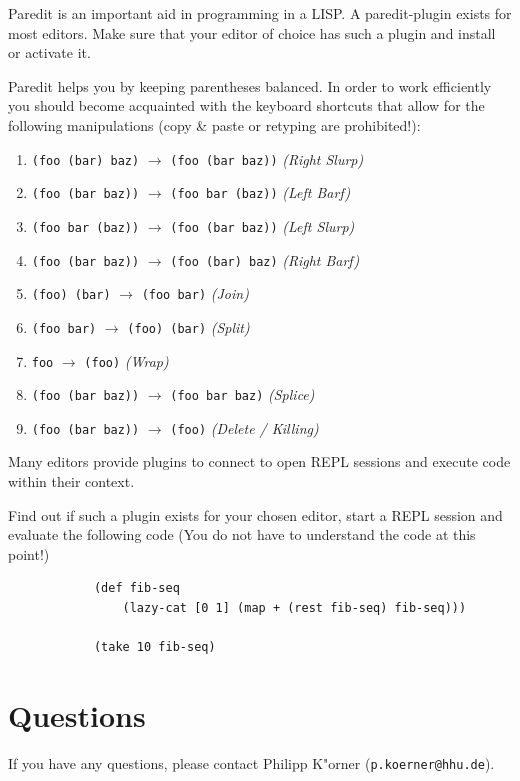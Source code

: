 \documentclass[11pt,a4paper]{article}
\begin{document}
	
	\begin{exercise}[Paredit]
		Paredit is an important aid in programming in a LISP.
		A paredit-plugin exists for most editors.
		Make sure that your editor of choice has such a plugin
		and install or activate it.
		
		
		Paredit helps you by keeping parentheses balanced.
		In order to work efficiently you should
		become acquainted with the keyboard shortcuts that allow for the following manipulations
		(copy \& paste or retyping are prohibited!):
		
		\begin{enumerate}[label=\alph*)]
			\item
			\texttt{(foo (bar) baz)} $\longrightarrow$ \texttt{(foo (bar baz))} \textit{(Right Slurp)}
			\item
			\texttt{(foo (bar baz))} $\longrightarrow$ \texttt{(foo bar (baz))} \textit{(Left Barf)}
			\item
			\texttt{(foo bar (baz))} $\longrightarrow$ \texttt{(foo (bar baz))} \textit{(Left Slurp)}
			\item
			\texttt{(foo (bar baz))} $\longrightarrow$ \texttt{(foo (bar) baz)} \textit{(Right Barf)}
			\item
			\texttt{(foo) (bar)} $\longrightarrow$ \texttt{(foo bar)} \textit{(Join)}
			\item
			\texttt{(foo bar)} $\longrightarrow$ \texttt{(foo) (bar)} \textit{(Split)}
			\item
			\texttt{foo} $\longrightarrow$ \texttt{(foo)} \textit{(Wrap)}
			\item
			\texttt{(foo (bar baz))} $\longrightarrow$ \texttt{(foo bar baz)} \textit{(Splice)}
			\item
			\texttt{(foo (bar baz))} $\longrightarrow$ \texttt{(foo)} \textit{(Delete / Killing)}
		\end{enumerate}
		
	\end{exercise}
	
	\begin{exercise}
		Many editors provide plugins
		to connect to open REPL sessions
		and execute code within their context.
		
		Find out if such a plugin exists for your chosen editor,
		start a REPL session and evaluate the following
		code (You do not have to understand the code at this point!)
		
		\begin{verbatim}
			(def fib-seq
			    (lazy-cat [0 1] (map + (rest fib-seq) fib-seq)))
			
			(take 10 fib-seq)
		\end{verbatim}
	\end{exercise}
	
	
	\section*{Questions}
	If you have any questions, please contact Philipp K"orner (\texttt{p.koerner@hhu.de}).
\end{document}
